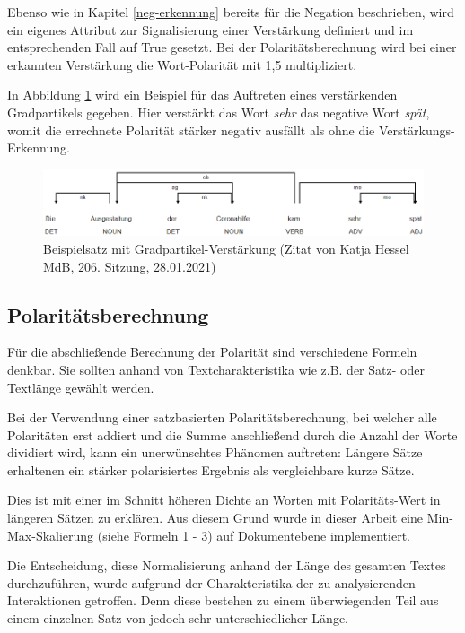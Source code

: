 Ebenso wie in Kapitel \ref{neg-erkennung} bereits für die Negation beschrieben, wird ein eigenes Attribut zur Signalisierung einer Verstärkung definiert und im entsprechenden Fall auf True gesetzt. 
Bei der Polaritätsberechnung wird bei einer erkannten Verstärkung die Wort-Polarität mit 1,5 multipliziert. 

In Abbildung \ref{hessel} wird ein Beispiel für das Auftreten eines verstärkenden Gradpartikels gegeben. 
Hier verstärkt das Wort \textit{sehr} das negative Wort \textit{spät}, womit die errechnete Polarität stärker negativ ausfällt als ohne die Verstärkungs-Erkennung. 

\begin{figure}[htb]
\centerline{\includegraphics[width=1\textwidth]{hessel.png}}
\caption{Beispielsatz mit Gradpartikel-Verstärkung (Zitat von Katja Hessel MdB, 206. Sitzung, 28.01.2021)}
\label{hessel}
\end{figure}

\subsection{Polaritätsberechnung}
\label{polberechnung}
Für die abschließende Berechnung der Polarität sind verschiedene Formeln denkbar. 
Sie sollten anhand von Textcharakteristika wie z.B. der Satz- oder Textlänge gewählt werden. 

Bei der Verwendung einer satzbasierten Polaritätsberechnung, bei welcher alle Polaritäten erst addiert und die Summe anschließend durch die Anzahl der Worte dividiert wird, kann ein unerwünschtes Phänomen auftreten: 
Längere Sätze erhaltenen ein stärker polarisiertes Ergebnis als vergleichbare kurze Sätze. 

Dies ist mit einer im Schnitt höheren Dichte an Worten mit Polaritäts-Wert in längeren Sätzen zu erklären. 
Aus diesem Grund wurde in dieser Arbeit eine Min-Max-Skalierung (siehe Formeln 1 - 3) auf Dokumentebene implementiert. 

Die Entscheidung, diese Normalisierung anhand der Länge des gesamten Textes durchzuführen, wurde aufgrund der Charakteristika der zu analysierenden Interaktionen getroffen. 
Denn diese bestehen zu einem überwiegenden Teil aus einem einzelnen Satz von jedoch sehr unterschiedlicher Länge. 

